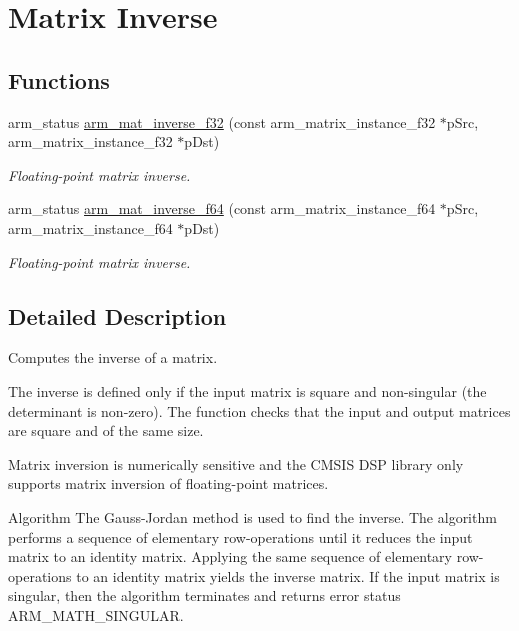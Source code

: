 \hypertarget{group__MatrixInv}{}\section{Matrix Inverse}
\label{group__MatrixInv}
\subsection*{Functions}
\begin{DoxyCompactItemize}
\item 
arm\+\_\+status \hyperlink{group__MatrixInv_ga542be7aabbf7a2297a4b62cf212910e3}{arm\+\_\+mat\+\_\+inverse\+\_\+f32} (const arm\+\_\+matrix\+\_\+instance\+\_\+f32 $\ast$p\+Src, arm\+\_\+matrix\+\_\+instance\+\_\+f32 $\ast$p\+Dst)
\begin{DoxyCompactList}\small\item\em Floating-\/point matrix inverse. \end{DoxyCompactList}\item 
arm\+\_\+status \hyperlink{group__MatrixInv_gaede2367c02df083cc915ddd5d8fae838}{arm\+\_\+mat\+\_\+inverse\+\_\+f64} (const arm\+\_\+matrix\+\_\+instance\+\_\+f64 $\ast$p\+Src, arm\+\_\+matrix\+\_\+instance\+\_\+f64 $\ast$p\+Dst)
\begin{DoxyCompactList}\small\item\em Floating-\/point matrix inverse. \end{DoxyCompactList}\end{DoxyCompactItemize}


\subsection{Detailed Description}
Computes the inverse of a matrix.

The inverse is defined only if the input matrix is square and non-\/singular (the determinant is non-\/zero). The function checks that the input and output matrices are square and of the same size.

Matrix inversion is numerically sensitive and the C\+M\+S\+IS D\+SP library only supports matrix inversion of floating-\/point matrices.

\begin{DoxyParagraph}{Algorithm}
The Gauss-\/\+Jordan method is used to find the inverse. The algorithm performs a sequence of elementary row-\/operations until it reduces the input matrix to an identity matrix. Applying the same sequence of elementary row-\/operations to an identity matrix yields the inverse matrix. If the input matrix is singular, then the algorithm terminates and returns error status {\ttfamily A\+R\+M\+\_\+\+M\+A\+T\+H\+\_\+\+S\+I\+N\+G\+U\+L\+AR}. 
\end{DoxyParagraph}


